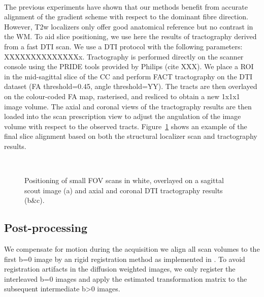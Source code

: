 \paragraph{}
The previous experiments have shown that our \SF{} methods benefit from accurate alignment of the gradient scheme with respect to the dominant fibre direction. However, T2w localizers only offer good anatomical reference but no contrast in the WM. To aid slice positioning, we use here the results of tractography derived from a fast DTI scan. We use a DTI protocol with the following parameters: XXXXXXXXXXXXXXx. Tractography is performed directly on the scanner console using the PRIDE tools provided by Philips (cite XXX). We place a ROI in the mid-sagittal slice of the CC and perform FACT tractography on the DTI dataset (FA threshold=0.45, angle threshold=YY). The tracts are then overlayed on the colour-coded FA map, rasterised, and resliced to obtain a new 1x1x1 image volume. The axial and coronal views of the tractography results are then loaded into the scan prescription view to adjust the angulation of the \SF{} image volume with respect to the observed tracts.  Figure~\ref{fig:chap9 FOV positioning} shows an example of the final slice alignment based on both the structural localizer scan and tractography results. 

\begin{figure}[ht]
	\centering
	\begin{minipage}{0.35\textwidth}
	\\
	\end{minipage}\hspace{0.05\textwidth}
	\begin{minipage}{0.53\textwidth}
	\end{minipage}
	
	\caption{Positioning of small FOV scans in white, overlayed on a sagittal scout image (a) and axial and coronal DTI tractography results (b\&c).}
	\label{fig:chap9 FOV positioning}	
\end{figure}
\subsection*{Post-processing}
We compensate for motion during the acquisition we align all scan volumes to the first b=0 image by an rigid registration method\cite{XX} as implemented in \cite{niftyreg}. To avoid registration artifacts in the diffusion weighted images, we only register the interleaved b=0 images and apply the estimated transformation matrix to the subsequent intermediate b>0 images.   

